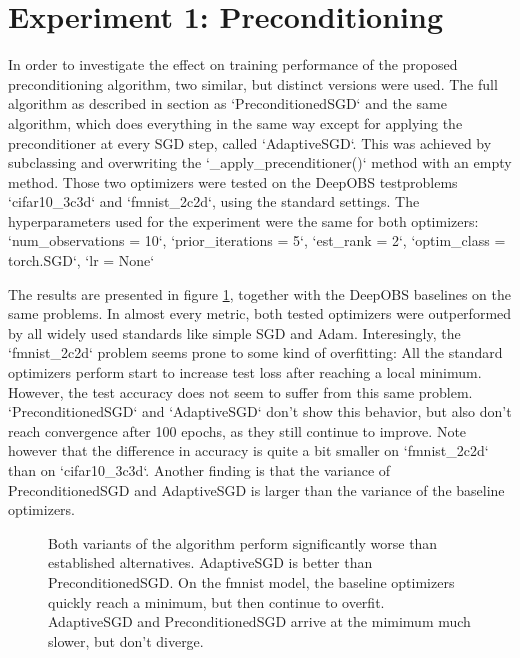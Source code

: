 \documentclass[twoside,12pt,a4paper]{report}
\begin{document}
\section{Experiment 1: Preconditioning}
\begin{markdown}
In order to investigate the effect on training performance of the proposed preconditioning algorithm, two similar, but distinct versions were used. The full algorithm as described in section  as `PreconditionedSGD` and the same algorithm, which does everything in the same way except for applying the preconditioner at every SGD step, called `AdaptiveSGD`. This was achieved by subclassing and overwriting the `_apply_precenditioner()` method with an empty method. Those two optimizers were tested on the DeepOBS testproblems `cifar10_3c3d` and `fmnist_2c2d`, using the standard settings. 
The hyperparameters used for the experiment were the same for both optimizers: `num_observations = 10`, `prior_iterations = 5`, `est_rank = 2`, `optim_class = torch.SGD`, `lr = None`

The results are presented in figure \ref{fig:exp_preconditioning}, together with the DeepOBS baselines on the same problems. In almost every metric, both tested optimizers were outperformed by all widely used standards like simple SGD and Adam. Interesingly, the `fmnist_2c2d` problem seems prone to some kind of overfitting: All the standard optimizers perform start to increase test loss after reaching a local minimum. However, the test accuracy does not seem to suffer from this same problem. `PreconditionedSGD` and `AdaptiveSGD` don't show this behavior, but also don't reach convergence after 100 epochs, as they still continue to improve. Note however that the difference in accuracy is quite a bit smaller on `fmnist_2c2d` than on `cifar10_3c3d`.
Another finding is that the variance of PreconditionedSGD and AdaptiveSGD is larger than the variance of the baseline optimizers.
\end{markdown}
\begin{figure}
	
	\caption{Both variants of the algorithm perform significantly worse than established alternatives. AdaptiveSGD is better than PreconditionedSGD. On the fmnist model, the baseline optimizers quickly reach a minimum, but then continue to overfit. AdaptiveSGD and PreconditionedSGD arrive at the mimimum much slower, but don't diverge.}
	\label{fig:exp_preconditioning}
\end{figure}
\end{document}
